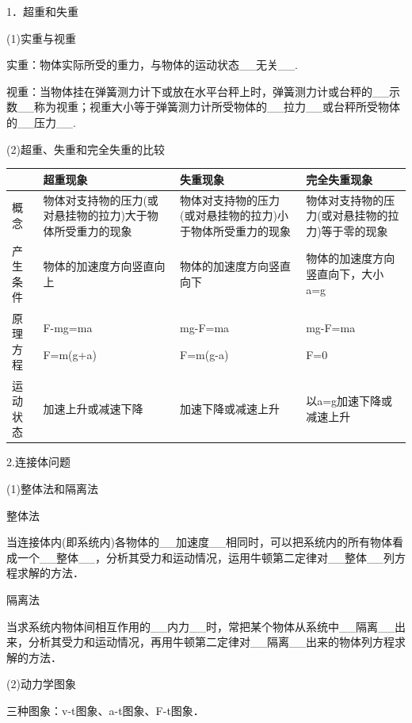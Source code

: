 \documentclass[cn,10.5pt,chinese,mac,chinesefont=founder]{elegantbook}
\begin{document}
1．超重和失重

(1)实重与视重

实重：物体实际所受的重力，与物体的运动状态\_\_无关\_\_.

视重：当物体挂在弹簧测力计下或放在水平台秤上时，弹簧测力计或台秤的\_\_示数\_\_称为视重；视重大小等于弹簧测力计所受物体的\_\_拉力\_\_或台秤所受物体的\_\_压力\_\_.

(2)超重、失重和完全失重的比较

\begin{longtable}[]{@{}m{1.6cm}m{4.7cm}m{4.7cm}m{3.5cm}@{}}
\toprule
& 超重现象 & 失重现象 & 完全失重现象\tabularnewline
\midrule
\endhead
概念 &
物体对支持物的压力(或对悬挂物的拉力)大于物体所受重力的现象 &
物体对支持物的压力(或对悬挂物的拉力)小于物体所受重力的现象 &
物体对支持物的压力(或对悬挂物的拉力)等于零的现象\tabularnewline
产生条件& 物体的加速度方向竖直向上 &物体的加速度方向竖直向下&物体的加速度方向竖直向下，大小a=g　\tabularnewline
原理方程& \begin{minipage}[t]{0.22\columnwidth}\raggedright
F-mg=ma

F=m(g+a)\strut
\end{minipage} & \begin{minipage}[t]{0.22\columnwidth}\raggedright
mg-F=ma

F=m(g-a)\strut
\end{minipage} & \begin{minipage}[t]{0.22\columnwidth}\raggedright
mg-F=ma

F=0\strut
\end{minipage}\tabularnewline
运动状态 & 加速上升或减速下降 &
加速下降或减速上升 &
以a=g加速下降或减速上升\tabularnewline
\bottomrule
\end{longtable}

2.连接体问题

(1)整体法和隔离法

整体法

当连接体内(即系统内)各物体的\_\_加速度\_\_相同时，可以把系统内的所有物体看成一个\_\_整体\_\_，分析其受力和运动情况，运用牛顿第二定律对\_\_整体\_\_列方程求解的方法．

隔离法

当求系统内物体间相互作用的\_\_内力\_\_时，常把某个物体从系统中\_\_隔离\_\_出来，分析其受力和运动情况，再用牛顿第二定律对\_\_隔离\_\_出来的物体列方程求解的方法．

(2)动力学图象

三种图象：v-t图象、a-t图象、F-t图象．
\end{document}

